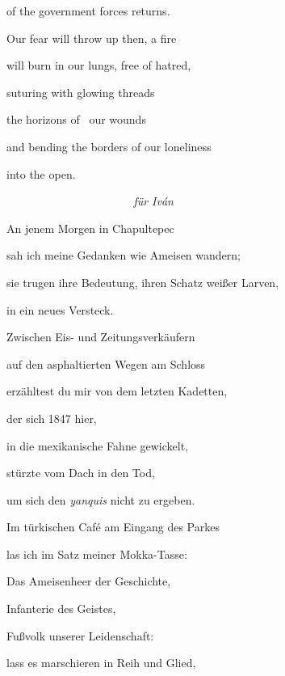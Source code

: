 \documentclass[a4paper]{article}
\begin{document}
of the government forces returns.


\bigskip

Our fear will throw up then, a fire 

will burn in our lungs, free of hatred,


\bigskip

suturing with glowing threads 

the horizons of \ our wounds


\bigskip

and bending the borders of our loneliness

into the open.


\bigskip


\bigskip


\bigskip


\bigskip


\bigskip


{\itshape
\ \ \ \ \ \ \ \ \ \ \ \ \ \ \ \ \ \ \ \ \ \ für Iván}


\bigskip

An jenem Morgen in Chapultepec

sah ich meine Gedanken wie Ameisen wandern;

sie trugen ihre Bedeutung, ihren Schatz weißer Larven,

in ein neues Versteck.


\bigskip

Zwischen Eis- und Zeitungsverkäufern

auf den asphaltierten Wegen am Schloss 

erzähltest du mir von dem letzten Kadetten, 

der sich 1847 hier, 

in die mexikanische Fahne gewickelt,

stürzte vom Dach in den Tod,

um sich den \textit{yanquis} nicht zu ergeben.


\bigskip

Im türkischen Café am Eingang des Parkes

las ich im Satz meiner Mokka-Tasse: 


\bigskip

Das Ameisenheer der Geschichte,

Infanterie des Geistes,

Fußvolk unserer Leidenschaft:

lass es marschieren in Reih und Glied,
\end{document}
